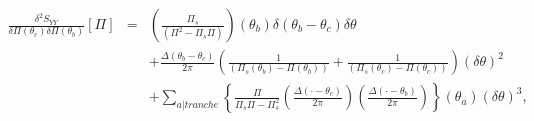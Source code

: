 	\begin{eqnarray}
		\frac{ \delta^2 S_{YY} }{ \delta \Pi(\theta_c) \delta \Pi(\theta_b)  } [\Pi ]  & = &   \left (  \frac{\Pi_s}{(\Pi^2  - \Pi_s\Pi)}    \right )(\theta_b) \delta( \theta_b - \theta_c)  \delta \theta  \\
		&  &  +   \frac{ \Delta ( \theta_b - \theta_c)}{ 2\pi} \left (  \frac{1 }{(\Pi_s(\theta_b) -\Pi(\theta_b)) }  +  \frac{1 }{( \Pi_s(\theta_c)  -   \Pi(\theta_c) ) } \right )(\delta \theta)^2  \\
		& & + \sum_{a \vert tranche}   \left \{  \frac{\Pi }{\Pi_s\Pi - \Pi_s^2 }\left (  \frac{\Delta ( \cdot - \theta_c )}{2\pi} \right )\left (  \frac{\Delta ( \cdot - \theta_b )}{2\pi} \right )  \right \}(\theta_a)( \delta \theta)^3 ,		
	\end{eqnarray}
